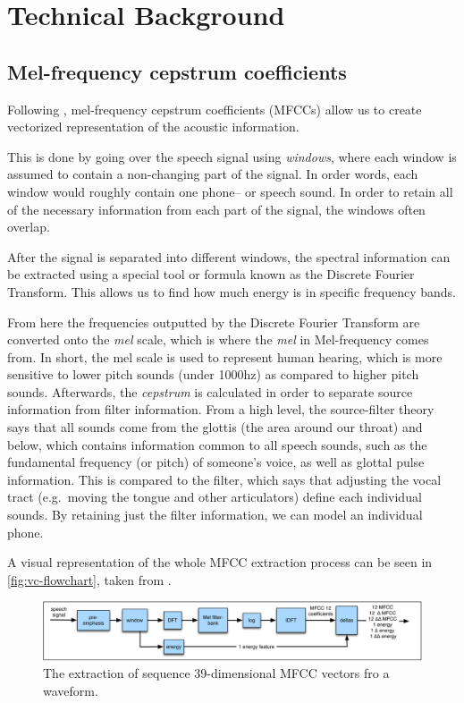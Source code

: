 \documentclass
[
    a4paper,
    twoside,
    12pt
]
{report}
\begin{document}
\hypertarget{technical-background}{%
\section{Technical Background}\label{technical-background}}

\subsection{Mel-frequency cepstrum coefficients}

Following \textcite{jurafsky2009}, mel-frequency cepstrum coefficients
(MFCCs) allow us to create vectorized representation of the acoustic
information.

This is done by going over the speech signal using \emph{windows}, where
each window is assumed to contain a non-changing part of the signal. In
order words, each window would roughly contain one phone-- or speech
sound. In order to retain all of the necessary information from each
part of the signal, the windows often overlap.

After the signal is separated into different windows, the spectral
information can be extracted using a special tool or formula known as
the Discrete Fourier Transform. This allows us to find how much energy
is in specific frequency bands.

From here the frequencies outputted by the Discrete Fourier Transform
are converted onto the \emph{mel} scale, which is where the \emph{mel}
in Mel-frequency comes from. In short, the mel scale is used to
represent human hearing, which is more sensitive to lower pitch sounds
(under 1000hz) as compared to higher pitch sounds. Afterwards, the
\emph{cepstrum} is calculated in order to separate source information
from filter information. From a high level, the source-filter theory
says that all sounds come from the glottis (the area around our throat)
and below, which contains information common to all speech sounds, such
as the fundamental frequency (or pitch) of someone's voice, as well as
glottal pulse information. This is compared to the filter, which says
that adjusting the vocal tract (e.g.~moving the tongue and other
articulators) define each individual sounds. By retaining just the
filter information, we can model an individual phone.

A visual representation of the whole MFCC extraction process can be seen
in \autoref{fig:vc-flowchart}, taken from \textcite{jurafsky2009}.

\begin{figure}[H]
\centering
\includegraphics[scale=0.22]{img/mfcc-extraction.png}
\caption{The extraction of sequence 39-dimensional MFCC vectors fro a waveform.}
\label{fig:vc-flowchart}
\end{figure}
\end{document}
